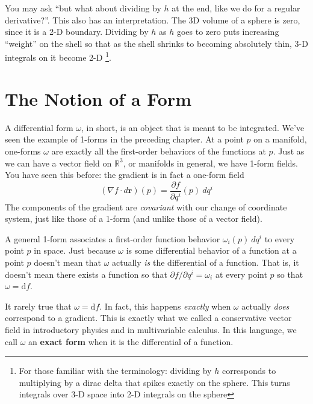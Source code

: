 \documentclass[../master.tex]{subfiles}
\begin{document}
	You may ask ``but what about dividing by $h$ at the end, like we do for a regular derivative?''. This also has an interpretation. The 3D volume of a sphere is zero, since it is a 2-D boundary. Dividing by $h$ as $h$ goes to zero puts increasing ``weight'' on the shell so that as the shell shrinks to becoming absolutely thin, 3-D integrals on it become 2-D \footnote{For those familiar with the terminology: dividing by $h$ corresponds to multiplying by a dirac delta that spikes exactly on the sphere. This turns integrals over 3-D space into 2-D integrals on the sphere}.
	
	
	
\section{The Notion of a Form}

	A differential form $\omega$, in short, is an object that is meant to be integrated. We've seen the example of 1-forms in the preceding chapter. At a point $p$ on a manifold, one-forms $\omega$ are exactly all the first-order behaviors of the functions at $p$. Just as we can have a vector field on $\mathbb{R}^3$, or manifolds in general, we have 1-form fields. You have seen this before: the gradient is in fact a one-form field
	\begin{equation}
		(\nabla f \cdot d\mathbf r) (p) = \frac{\partial f}{\partial q^i}(p)~ dq^i
	\end{equation}
	The components of the gradient are \emph{covariant} with our change of coordinate system, just like those of a 1-form (and unlike those of a vector field). 
	
	A general 1-form associates a first-order function behavior $\omega_i(p)~ dq^i$ to every point $p$ in space. Just because $\omega$ is some differential behavior of a function at a point $p$ doesn't mean that $\omega$ actually \emph{is} the differential of a function. That is, it doesn't mean there exists a function so that $\partial f/\partial q^i = \omega_i$ at every point $p$ so that $\omega = \mathrm df$.
	
	It rarely true that $\omega = \mathrm df$. In fact, this happens \emph{exactly} when $\omega$ actually \emph{does} correspond to a gradient. This is exactly what we called a conservative vector field in introductory physics and in multivariable calculus. In this language, we call $\omega$ an \textbf{exact form} when it is the differential of a function.
	
\end{document}
